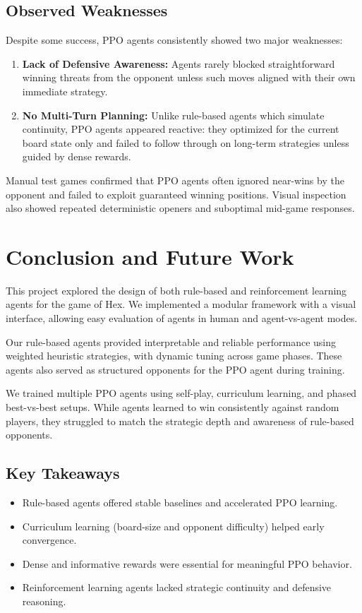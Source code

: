 \documentclass[conference]{IEEEtran}
\begin{document}
\subsection{Observed Weaknesses}

Despite some success, PPO agents consistently showed two major weaknesses:
\begin{enumerate}
    \item \textbf{Lack of Defensive Awareness:} Agents rarely blocked straightforward winning threats from the opponent unless such moves aligned with their own immediate strategy.
    \item \textbf{No Multi-Turn Planning:} Unlike rule-based agents which simulate continuity, PPO agents appeared reactive: they optimized for the current board state only and failed to follow through on long-term strategies unless guided by dense rewards.
\end{enumerate}

Manual test games confirmed that PPO agents often ignored near-wins by the opponent and failed to exploit guaranteed winning positions. Visual inspection also showed repeated deterministic openers and suboptimal mid-game responses.

\section{Conclusion and Future Work}

This project explored the design of both rule-based and reinforcement learning agents for the game of Hex. We implemented a modular framework with a visual interface, allowing easy evaluation of agents in human and agent-vs-agent modes.

Our rule-based agents provided interpretable and reliable performance using weighted heuristic strategies, with dynamic tuning across game phases. These agents also served as structured opponents for the PPO agent during training.

We trained multiple PPO agents using self-play, curriculum learning, and phased best-vs-best setups. While agents learned to win consistently against random players, they struggled to match the strategic depth and awareness of rule-based opponents.

\subsection*{Key Takeaways}
\begin{itemize}
    \item Rule-based agents offered stable baselines and accelerated PPO learning.
    \item Curriculum learning (board-size and opponent difficulty) helped early convergence.
    \item Dense and informative rewards were essential for meaningful PPO behavior.
    \item Reinforcement learning agents lacked strategic continuity and defensive reasoning.
\end{itemize}
\end{document}
